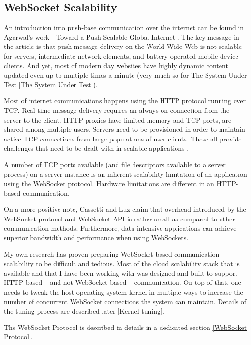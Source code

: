 \documentclass{uvamscse}
\begin{document}
\subsection{WebSocket Scalability}\label{WebSocket Scalability}

An introduction into push-base communication over the internet can be found in Agarwal’s work - Toward a Push-Scalable Global Internet \cite{PushScale}. The key message in the article is that push message delivery on the World Wide Web is not scalable for servers, intermediate network elements, and battery-operated mobile device clients. And yet, most of modern day websites have highly dynamic content updated even up to multiple times a minute (very much so for The System Under Test \ref{The System Under Test}).

Most of internet communications happens using the HTTP protocol running over TCP. Real-time message delivery requires an always-on connection from the server to the client. HTTP proxies have limited memory and TCP ports, are shared among multiple users. Servers need to be provisioned in order to maintain active TCP connections from large populations of user  clients. These all provide challenges that need to be dealt with in scalable applications \cite{PushScale}.

A number of TCP ports available (and file descriptors available to a server process) on a server instance is an inherent scalability limitation of an application using the WebSocket protocol. Hardware limitations are different in an HTTP-based communication.

On a more positive note, Cassetti and Luz \cite{WebsApi} claim that overhead introduced by the WebSocket protocol and WebSocket API is rather small as compared to other communication methods. Furthermore, data intensive applications can achieve superior bandwidth and performance when using WebSockets.

My own research has proven preparing WebSocket-based communication scalability to be difficult and tedious. Most of the cloud scalability stack that is available and that I have been working with was designed and built to support HTTP-based -- and not WebSocket-based -- communication. On top of that, one needs to tweak the host operating system kernel in multiple ways to increase the number of concurrent WebSocket connections the system can maintain. Details of the tuning process are described later \ref{Kernel tuning}.

The WebSocket Protocol is described in details in a dedicated section \ref{WebSocket Protocol}.
\end{document}
